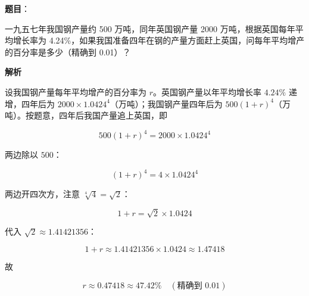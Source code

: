 \begin{answer}

\textbf{题目}：

一九五七年我国钢产量约 500 万吨，同年英国钢产量 2000 万吨，根据英国每年平均增长率为 4.24\%，如果我国准备四年在钢的产量方面赶上英国，问每年平均增产的百分率是多少（精确到 0.01）？

\textbf{解析}

设我国钢产量每年平均增产的百分率为 $r$。英国钢产量以年平均增长率 $4.24\%$ 递增，四年后为 $2000\times1.0424^{4}$（万吨）；我国钢产量四年后为 $500(1+r)^{4}$（万吨）。按题意，四年后我国产量追上英国，即

\nopagebreak[4]
\[
500(1+r)^{4}=2000\times1.0424^{4}
\]

两边除以 $500$：

\nopagebreak[4]
\[
(1+r)^{4}=4\times1.0424^{4}
\]

两边开四次方，注意 $\sqrt[4]{4}=\sqrt2$：

\nopagebreak[4]
\[
1+r=\sqrt2\times1.0424
\]

代入 $\sqrt2\approx1.41421356$：

\nopagebreak[4]
\[
1+r\approx1.41421356\times1.0424\approx1.47418
\]

故

\nopagebreak[4]
\[
r\approx0.47418\approx47.42\%\quad(\text{精确到 }0.01)
\]


\end{answer}
